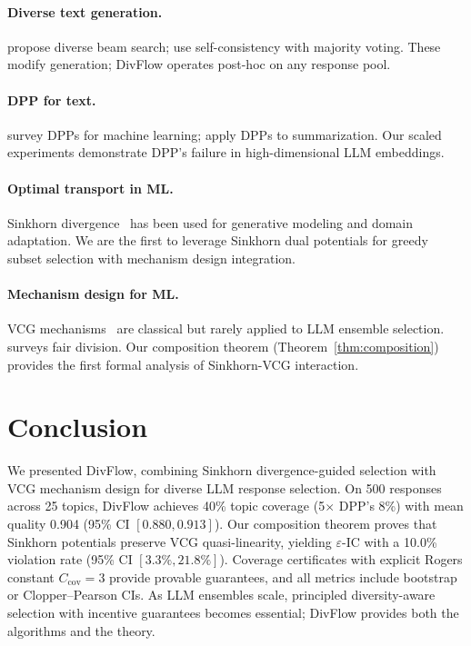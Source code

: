 \documentclass[10pt]{article}
\begin{document}
\paragraph{Diverse text generation.}
\citet{li2023diverse} propose diverse beam search; \citet{wang2023selfconsistency} use self-consistency with majority voting.
These modify generation; DivFlow operates post-hoc on any response pool.

\paragraph{DPP for text.}
\citet{kulesza2012determinantal} survey DPPs for machine learning; \citet{cho2019multi} apply DPPs to summarization.
Our scaled experiments demonstrate DPP's failure in high-dimensional LLM embeddings.

\paragraph{Optimal transport in ML.}
Sinkhorn divergence~\citep{cuturi2013sinkhorn, feydy2019interpolating} has been used for generative modeling and domain adaptation.
We are the first to leverage Sinkhorn dual potentials for greedy subset selection with mechanism design integration.

\paragraph{Mechanism design for ML.}
VCG mechanisms~\citep{vickrey1961counterspeculation, groves1973incentives} are classical but rarely applied to LLM ensemble selection.
\citet{procaccia2013cake} surveys fair division.
Our composition theorem (Theorem~\ref{thm:composition}) provides the first formal analysis of Sinkhorn-VCG interaction.

\section{Conclusion}
\label{sec:conclusion}

We presented DivFlow, combining Sinkhorn divergence-guided selection with VCG mechanism design for diverse LLM response selection.
On 500 responses across 25 topics, DivFlow achieves 40\% topic coverage (5$\times$ DPP's 8\%) with mean quality 0.904 (95\% CI $[0.880, 0.913]$).
Our composition theorem proves that Sinkhorn potentials preserve VCG quasi-linearity, yielding $\varepsilon$-IC with a 10.0\% violation rate (95\% CI $[3.3\%, 21.8\%]$).
Coverage certificates with explicit Rogers constant $C_{\mathrm{cov}} = 3$ provide provable guarantees, and all metrics include bootstrap or Clopper--Pearson CIs.
As LLM ensembles scale, principled diversity-aware selection with incentive guarantees becomes essential; DivFlow provides both the algorithms and the theory.
\end{document}
